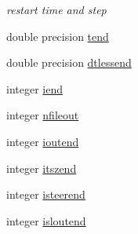 \textbf{ }\par
{\em restart time and step }\begin{DoxyCompactItemize}
\item 
double precision \mbox{\hyperlink{namespaceaccsimulatorclass_a3621f5f3a672e424e33a20cc48e81c2c}{tend}}
\item 
double precision \mbox{\hyperlink{namespaceaccsimulatorclass_a4717e8c2e59b129e66cf73a4fddbba50}{dtlessend}}
\item 
integer \mbox{\hyperlink{namespaceaccsimulatorclass_aa5a33a2f7563789fd061ef4e28d010a5}{iend}}
\item 
integer \mbox{\hyperlink{namespaceaccsimulatorclass_afbdd0b90129947de05fe38d3350ee006}{nfileout}}
\item 
integer \mbox{\hyperlink{namespaceaccsimulatorclass_acf982b8b087c1b467ce8e8fc1f99d0a4}{ioutend}}
\item 
integer \mbox{\hyperlink{namespaceaccsimulatorclass_a081922751fd50e67a7965e0fed6b56fb}{itszend}}
\item 
integer \mbox{\hyperlink{namespaceaccsimulatorclass_a6fd9b5ae8cca8fa04bb8ba824b4a82f0}{isteerend}}
\item 
integer \mbox{\hyperlink{namespaceaccsimulatorclass_a87e5ee2cf1ed3fb396f43f6996517831}{isloutend}}
\end{DoxyCompactItemize}

